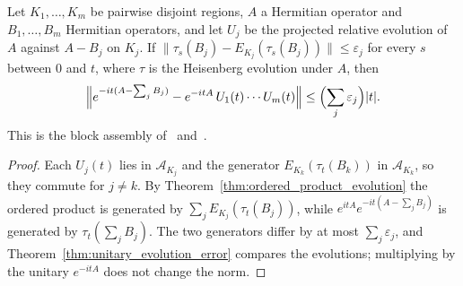 \begin{theorem}
    \label{thm:dynamics_disjoint_relative}
    \leanok
    Let $K_1,\dots,K_m$ be pairwise disjoint regions, $A$ a Hermitian operator and
    $B_1,\dots,B_m$ Hermitian operators, and let $U_j$ be the projected relative
    evolution of $A$ against $A-B_j$ on $K_j$. If
    $\lVert\tau_s(B_j)-E_{K_j}(\tau_s(B_j))\rVert\leq\varepsilon_j$ for every $s$
    between $0$ and $t$, where $\tau$ is the Heisenberg evolution under $A$, then
    \begin{align*}
        \Bigl\lVert e^{-it(A-\sum_jB_j)}-e^{-itA}\,U_1(t)\cdots U_m(t)\Bigr\rVert
            \leq\Bigl(\sum_j\varepsilon_j\Bigr)|t|.
    \end{align*}
    This is the block assembly of~\cite{Osborne2006Efficient}
    and~\cite[Section~5.4]{Huang2014AreaLaw}.
\end{theorem}
\begin{proof}\leanok
    Each $U_j(t)$ lies in $\mathcal A_{K_j}$ and the generator
    $E_{K_k}(\tau_t(B_k))$ in $\mathcal A_{K_k}$, so they commute for $j\neq k$.
    By Theorem~\ref{thm:ordered_product_evolution} the ordered product is
    generated by $\sum_jE_{K_j}(\tau_t(B_j))$, while
    $e^{itA}e^{-it(A-\sum_jB_j)}$ is generated by $\tau_t(\sum_jB_j)$. The two
    generators differ by at most $\sum_j\varepsilon_j$, and
    Theorem~\ref{thm:unitary_evolution_error} compares the evolutions; multiplying
    by the unitary $e^{-itA}$ does not change the norm.
\end{proof}

